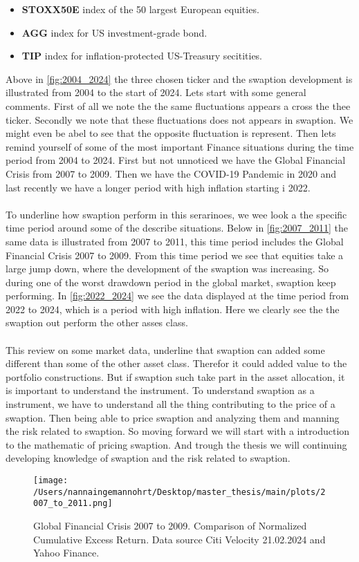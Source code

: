 \begin{itemize}
    \item \textbf{STOXX50E} \text{---}  index of the 50 largest European equities.
    \item \textbf{AGG} \text{---}  index for US investment-grade bond. 
    \item \textbf{TIP} \text{---}  index for inflation-protected US-Treasury secitities.
    \end{itemize}
\noindent
Above in \autoref{fig:2004_2024} the three chosen ticker and the swaption development
is illustrated from 2004 to the start of 2024. Lets start with some general comments.
First of all we note the the same fluctuations appears a cross the thee ticker. 
Secondly we note that these fluctuations does not appears in swaption. 
We might even be abel to see that the opposite fluctuation is represent. 
Then lets remind yourself of some of the most important Finance situations during 
the time period from 2004 to 2024. First but not unnoticed we have the Global Financial Crisis
from 2007 to 2009.  Then we have the COVID-19 Pandemic in 2020 and last recently we have a 
longer period with high inflation starting i 2022. 
\\\\
To underline how swaption perform in this serarinoes, we wee look a the specific time period
around some of the describe situations. Below in \autoref{fig:2007_2011} the same data is illustrated
from 2007 to 2011, this time period includes the Global Financial Crisis 2007 to 2009. 
From this time period we see that equities take a large jump down, where the development of the 
swaption was increasing. So during one of the worst drawdown period in the global market, 
swaption keep performing. In \autoref{fig:2022_2024} we see the data displayed at the 
time period from 2022 to 2024, which is a period with high inflation. 
Here we clearly see the the swaption out perform the other asses class. 
\\\\
This review on some market data, underline that swaption can added some different than some 
of the other asset class. Therefor it could added value to the portfolio constructions. 
But if swaption such take part in the asset allocation, it is important to understand the instrument.
To understand swaption as a instrument, we have to understand all the thing contributing to the price
of a swaption. Then being able to price swaption and analyzing them and manning the risk related to 
swaption.  So moving forward we will start with a introduction to the mathematic of pricing swaption. 
And trough the thesis we will continuing  developing knowledge of swaption and the risk related to swaption.
\begin{figure}[H]
    \centering
    \texttt{[image: /Users/nannaingemannohrt/Desktop/master\_thesis/main/plots/2007\_to\_2011.png]}
    \caption{Global Financial Crisis 2007 to 2009.  Comparison of Normalized Cumulative Excess Return. Data source Citi Velocity 21.02.2024 
    and Yahoo Finance.}
    \label{fig:2007_2011}
\end{figure}
\noindent

